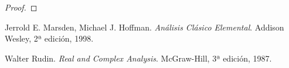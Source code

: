 \begin{proof}


\end{proof}


\newpage

\begin{thebibliography}{9}

  Jerrold E. Marsden, Michael  J. Hoffman.
  \emph{Análisis Clásico Elemental}.
  Addison Wesley,
  2ª edición,
  1998.

  Walter Rudin.
  \emph{Real and Complex Analysis}.
  McGraw-Hill,
  3ª edición,
  1987.

\end{thebibliography}
